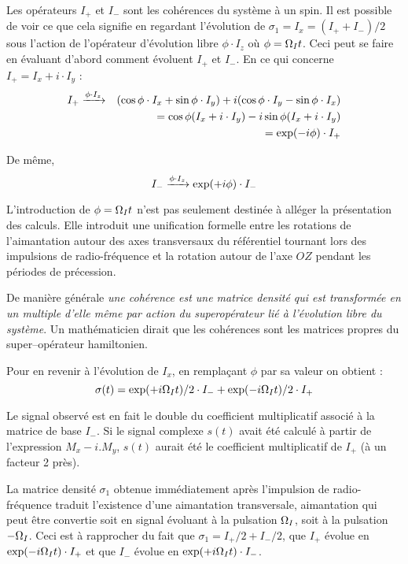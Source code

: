 Les opérateurs $I_+$ et $I_-$ sont les cohérences du système à un spin.
Il est possible de voir ce que cela signifie en regardant
l'évolution de $\sigma_1 = I_x = (I_+ + I_-)/2$ 
sous l'action de l'opérateur d'évolution libre
$\phi \cdot I_z$ où $\phi = \Omega_I t$.
Ceci peut se faire en évaluant d'abord comment évoluent $I_+$ et $I_-$.
En ce qui concerne $I_+ = I_x + i \cdot I_y$ :
\begin{eqnarray}
I_+ & \xrightarrow{\phi \cdot I_z} & 
(\cos\phi \cdot I_x + \sin\phi \cdot I_y) + i(\cos\phi \cdot I_y - \sin\phi \cdot I_x) \\
& & = \cos\phi(I_x + i \cdot I_y) -i\sin\phi(I_x + i \cdot I_y) \\
\label{eqn:evoliplus} & & = \exp(-i \phi) \cdot I_+
\end{eqnarray}

De même,
\begin{equation}
\label{eqn:evolimoins}
I_- \xrightarrow{\phi \cdot I_z} \exp(+i \phi) \cdot I_-
\end{equation}

L'introduction de $\phi = \Omega_I t$ n'est pas seulement destinée
à alléger la présentation des calculs.
Elle introduit une unification formelle entre les rotations
de l'aimantation autour des axes transversaux du référentiel tournant
lors des impulsions de radio-fréquence et la rotation autour de l'axe $OZ$ pendant
les périodes de précession.

De manière générale \emph{une cohérence est une matrice densité qui est transformée
en un multiple d'elle même par action du superopérateur lié à
l'évolution libre du système}.
Un mathématicien dirait que les cohérences sont les matrices propres
du super--opérateur hamiltonien.

Pour en revenir à l'évolution de $I_x$, en remplaçant $\phi$ par sa valeur 
on obtient :
\begin{equation}
\label{eqn:evolcoher}
\sigma(t) = \exp(+i \Omega_I t)/2 \cdot I_- + \exp(-i \Omega_I t)/2 \cdot I_+
\end{equation}

Le signal observé est en fait le double du coefficient multiplicatif 
associé à la matrice de base $I_-$. 
Si le signal complexe $s(t)$ avait été calculé à partir de l'expression 
$M_x - i.M_y$, $s(t)$ aurait été le coefficient multiplicatif de $I_+$
(à un facteur 2 près).

La matrice densité $\sigma_1$ obtenue immédiatement après l'impulsion de radio-fréquence
traduit l'existence d'une aimantation transversale,
aimantation qui peut être convertie soit en signal évoluant à la pulsation $\Omega_I$, 
soit à la pulsation $-\Omega_I$.
Ceci est à rapprocher du fait que $\sigma_1 = I_+/2 + I_-/2$,
que $I_+$ évolue en $\exp(-i \Omega_I t) \cdot I_+$ et 
que $I_-$ évolue en $\exp(+i \Omega_I t) \cdot I_-$.
 

